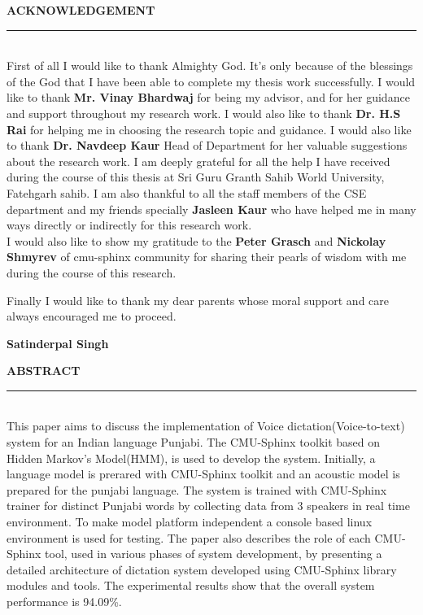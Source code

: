 \documentclass[12pt,a4paper,oldfontcommands]{memoir}
\newenvironment{acknowledgement}%
    {\large\bfseries\centering ACKNOWLEDGEMENT%
    \par\medskip\normalfont\normalsize}%
    {}%
\newenvironment{abs}%
    {\large\bfseries\centering ABSTRACT%
    \par\medskip\normalfont\normalsize}%
    {}%
\begin{document}
\newpage
\begin{acknowledgement}
\noindent\rule{17cm}{1.0 pt} \\

\justify
First of all I would like to thank Almighty God. It’s only because of the blessings of the God that I have been able to complete my thesis work successfully. I would like to thank \textbf{Mr. Vinay Bhardwaj} for being my advisor, and for her guidance and support throughout my research work. I would also like to thank \textbf{Dr. H.S Rai} for helping me in choosing the research topic and guidance. I would also like to thank \textbf{Dr. Navdeep Kaur} Head of Department for her valuable suggestions about the research work. I am deeply grateful for all the help I have received during the course of this thesis at Sri Guru Granth Sahib World University, Fatehgarh sahib. I am also thankful to all the staff members of the CSE department and my friends specially \textbf{Jasleen Kaur} who have helped me in many ways directly or indirectly for this research work. \\

I would also like to show my gratitude to the \textbf{Peter Grasch} and \textbf{Nickolay Shmyrev} of cmu-sphinx community for sharing their pearls of wisdom with me during the course of this research. 


Finally I would like to thank my dear parents whose moral support and care always encouraged me to proceed.\\

\vspace{3 cm}

\hfill \textbf{Satinderpal Singh}

\end{acknowledgement}
\newpage
\begin{abs}
\noindent\rule{16cm}{1.0 pt} \\
\justify
This paper aims to discuss the implementation of Voice dictation(Voice-to-text) system for an Indian language Punjabi. The CMU-Sphinx toolkit based on Hidden Markov's Model(HMM), is used to develop the system. Initially, a language model is prerared with CMU-Sphinx toolkit and an acoustic model is prepared for the punjabi language. The system is trained with CMU-Sphinx trainer for distinct Punjabi words by collecting data from 3 speakers in real time environment. To make model platform independent a console based linux  environment is used for testing. The paper also describes the
role of each CMU-Sphinx tool, used in various phases of system development, by presenting a detailed architecture of dictation system developed using CMU-Sphinx library modules and tools. The experimental results show that the overall system performance is 94.09\%. 

\end{abs}
\end{document}
